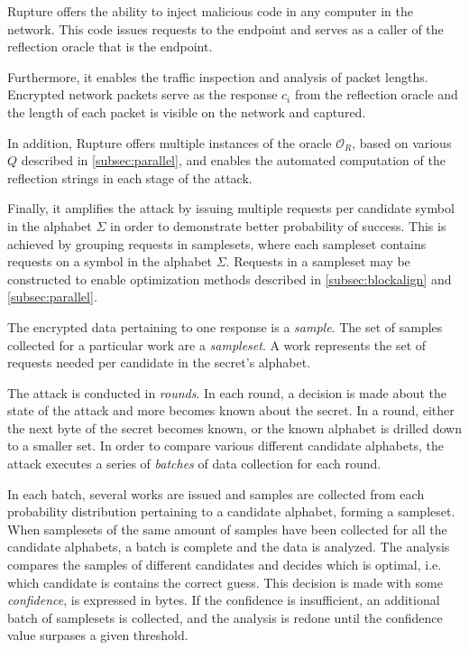 \documentclass[conference, letterpaper, 10pt]{IEEEtran}
\begin{document}
Rupture offers the ability to inject malicious code in any computer in the
network. This code issues requests to the endpoint and serves as a caller of
the reflection oracle that is the endpoint.

Furthermore, it enables the traffic inspection and analysis of packet
lengths. Encrypted network packets serve as the response $c_i$ from the
reflection oracle and the length of each packet is visible on the network and
captured.

In addition, Rupture offers multiple instances of the oracle $\mathcal{O}_R$, based
on various $Q$ described in \ref{subsec:parallel}, and enables the automated
computation of the reflection strings in each stage of the attack.

Finally, it amplifies the attack by issuing multiple requests per candidate
symbol in the alphabet $\Sigma$ in order to demonstrate better probability of
success. This is achieved by grouping requests in samplesets, where each
sampleset contains requests on a symbol in the alphabet $\Sigma$. Requests in a
sampleset may be constructed to enable optimization methods described in
\ref{subsec:blockalign} and \ref{subsec:parallel}.

The encrypted data pertaining to one response is a \textit{sample}.  The set of
samples collected for a particular work are a \textit{sampleset}. A work
represents the set of requests needed per candidate in the secret's alphabet.

The attack is conducted in \textit{rounds}. In each round, a decision is made
about the state of the attack and more becomes known about the secret. In a
round, either the next byte of the secret becomes known, or the known alphabet
is drilled down to a smaller set. In order to compare various different
candidate alphabets, the attack executes a series of \textit{batches} of data
collection for each round.

In each batch, several works are issued and samples are collected from each probability distribution
pertaining to a candidate alphabet, forming a sampleset. When samplesets of the
same amount of samples have been collected for all the candidate alphabets,
a batch is complete and the data is analyzed. The analysis compares the samples
of different candidates and decides which is optimal, i.e. which candidate is
contains the correct guess. This decision is made with some \textit{confidence},
is expressed in bytes. If the confidence is insufficient, an additional
batch of samplesets is collected, and the analysis is redone until the
confidence value surpases a given threshold.
\end{document}
